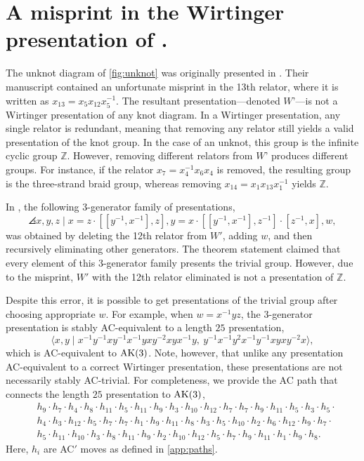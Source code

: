 
\section{A misprint in the Wirtinger presentation of \cite{MMS}.}  \label{app:mms}
The unknot diagram of \autoref{fig:unknot} was originally presented in \cite{MMS}. Their manuscript contained an unfortunate misprint in the 13th relator, where it is written as $x_{13}=x_5 x_{12} x_5^{-1}$.  The resultant presentation—denoted $W’$—is not a Wirtinger presentation of any knot diagram. In a Wirtinger presentation, any single relator is redundant, meaning that removing any relator still yields a valid presentation of the knot group. In the case of an unknot, this group is the infinite cyclic group $\mathbb{Z}$. However, removing different relators from $W’$ produces different groups. For instance, if the relator $x_{7} = x_4^{-1} x_{6} x_4$ is removed, the resulting group is the three-strand braid group, whereas removing $x_{14} = x_1 x_{13} x_1^{-1}$ yields $\mathbb{Z}$.

In \cite[Theorem 1.4]{MMS}, the following 3-generator family of presentations,
\[
\angles{ x,y,z \mid  x=z\cdot [[y^{-1},x^{-1}],z], y=x\cdot [[y^{-1},x^{-1}],z^{-1}]\cdot [z^{-1},x], w},
\] 
was obtained by deleting the 12th relator from $W'$, adding $w$, and then recursively eliminating other generators. The theorem statement claimed that every element of this 3-generator family presents the trivial group. However, due to the misprint, $W'$ with the 12th relator eliminated is not a presentation of $\mathbb{Z}$.

Despite this error, it is possible to get presentations of the trivial group after choosing appropriate $w$. For example, when $w = x^{-1} y z$, the 3-generator presentation is stably AC-equivalent to a length $25$ presentation,
\[
\langle x, y \mid
	x^{-1}y^{-1}xy^{-1}x^{-1}yxy^{-2}xyx^{-1}y, \
	y^{-1}x^{-1}y^2x^{-1}y^{-1}xyxy^{-2}x 
\rangle,
\]
which is AC-equivalent to $\text{AK}(3)$. Note, however, that unlike any presentation AC-equivalent to a correct Wirtinger presentation, these presentations are not necessarily stably AC-trivial. For completeness, we provide the AC path that connects the length $25$ presentation to $\text{AK}(3)$,
\[
\begin{aligned}
& h_9 \cdot h_7 \cdot h_4 \cdot h_8 \cdot h_{11} \cdot h_5 \cdot h_{11} \cdot h_9 \cdot h_3 \cdot h_{10} \cdot h_{12} \cdot h_7 \cdot h_7 \cdot h_9 \cdot h_{11} \cdot h_5 \cdot h_3 \cdot h_5 \cdot \\
& h_4 \cdot h_3 \cdot h_{12} \cdot h_5 \cdot h_7 \cdot h_7 \cdot h_1 \cdot h_9 \cdot h_{11} \cdot h_8 \cdot h_3 \cdot h_5 \cdot h_{10} \cdot h_2 \cdot h_6 \cdot h_{12} \cdot h_9 \cdot h_7 \cdot \\
& h_5 \cdot h_{11} \cdot h_{10} \cdot h_3 \cdot h_8 \cdot h_{11} \cdot h_9 \cdot h_2 \cdot h_{10} \cdot h_{12} \cdot h_5 \cdot h_7 \cdot h_9 \cdot h_{11} \cdot h_1 \cdot h_9 \cdot h_8.
\end{aligned}
\]
Here, $h_i$ are AC$'$ moves as defined in \autoref{app:paths}. 


